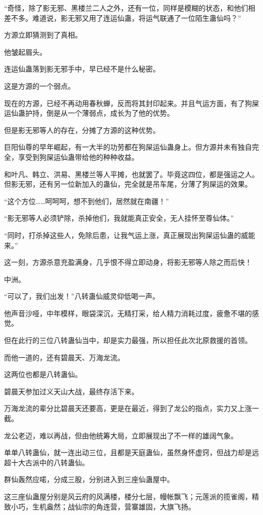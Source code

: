 \begin{this_body}
“奇怪，除了影无邪、黑楼兰二人之外，还有一位，同样是模糊的状态，和他们相差不多。难道说，影无邪又用了连运仙蛊，将运气联通了一位陌生蛊仙吗？”

方源立即猜测到了真相。

他皱起眉头。

连运仙蛊落到影无邪手中，早已经不是什么秘密。

这是方源的一个弱点。

现在的方源，已经不再动用春秋蝉，反而将其封印起来。并且气运方面，有了狗屎运仙蛊护持，倒是从一个薄弱点，成长为了他的优势。

但是影无邪等人的存在，分摊了方源的这种优势。

巨阳仙尊的早年崛起，有一大半的功劳都在狗屎运仙蛊身上。但方源并未有独自完全，享受到狗屎运仙蛊带给他的种种收益。

和叶凡、韩立、洪易、黑楼兰等人平摊，也就罢了。毕竟这四位，都是强运之人。但影无邪，还有另一位新加入的蛊仙，完全就是吊车尾，分薄了狗屎运的效果。

“这个方位……呵呵呵，想不到他们，居然就在南疆！”

“影无邪等人必须铲除，杀掉他们，我就能真正安全，无人挂怀至尊仙体。”

“同时，打杀掉这些人，免除后患，让我气运上涨，真正展现出狗屎运仙蛊的威能来。”

这一刻，方源杀意充盈满身，几乎恨不得立即动身，将影无邪等人除之而后快！

中洲。

“可以了，我们出发！”八转蛊仙威灵仰低喝一声。

他声音沙哑，中年模样，眼袋深沉，无精打采，给人精力消耗过度，疲惫不堪的感觉。

但在此行的三位八转蛊仙当中，却是实力最强，所以担任此次北原救援的首领。

而他一道的，还有碧晨天、万海龙流。

这两位也都是八转蛊仙。

碧晨天参加过义天山大战，最终存活下来。

万海龙流的辈分比碧晨天还要高，更是在最近，得到了龙公的指点，实力又上涨一截。

龙公老迈，难以再战，但由他统筹大局，立即展现出了不一样的雄阔气象。

单单八转蛊仙，就一连出动三位，且都是天庭蛊仙，虽然身怀虚窍，但战力却是远超十大古派中的八转蛊仙。

群仙轰然应喏，分成三股，分别进入到三座仙蛊屋中。

这三座仙蛊屋分别是风云府的风满楼，楼分七层，幔帐飘飞；元莲派的揽雀阁，精致小巧，生机盎然；战仙宗的角连营，营寨雄固，大旗飞扬。


\end{this_body}
